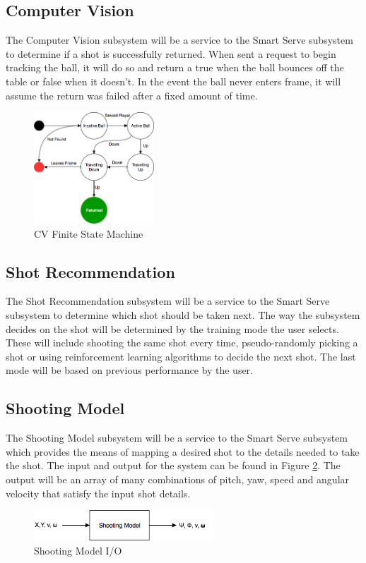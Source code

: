 \documentclass[11pt]{article}
\begin{document}
\subsection{Computer Vision}
The Computer Vision subsystem will be a service to the Smart Serve subsystem to determine if a shot is successfully returned. When sent a request to begin tracking the ball, it will do so and return a true when the ball bounces off the table or false when it doesn't. In the event the ball never enters frame, it will assume the return was failed after a fixed amount of time.
\begin{figure}[H]
   \centering
   \includegraphics[width=0.4\textwidth]{img/cvFSM.png}
   \caption{CV Finite State Machine}
   \label{fig:cv}
\end{figure}
\subsection{Shot Recommendation}
The Shot Recommendation subsystem will be a service to the Smart Serve subsystem to determine which shot should be taken next. The way the subsystem decides on the shot will be determined by the training mode the user selects. These will include shooting the same shot every time, pseudo-randomly picking a shot or using reinforcement learning algorithms to decide the next shot. The last mode will be based on previous performance by the user.

\subsection{Shooting Model}
The Shooting Model subsystem will be a service to the Smart Serve subsystem which provides the means of mapping a desired shot to the details needed to take the shot. The input and output for the system can be found in Figure \ref{fig:shotmodel}. The output will be an array of many combinations of pitch, yaw, speed and angular velocity that satisfy the input shot details.
\begin{figure}[htbp]
   \centering
   \includegraphics[width=0.6\textwidth]{img/ShotModel.png} %
   \caption{Shooting Model I/O}
   \label{fig:shotmodel}
\end{figure}
\end{document}
